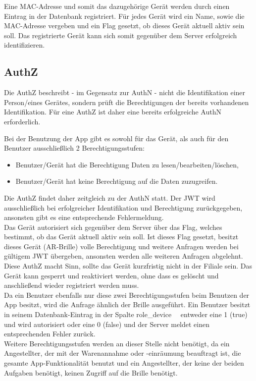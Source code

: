 Eine \ac{MAC}-Adresse und somit das dazugehörige Gerät werden durch einen Eintrag in der Datenbank registriert. Für jedes Gerät wird ein Name, sowie die \ac{MAC}-Adresse vergeben und ein Flag gesetzt, ob dieses Gerät aktuell aktiv sein soll. Das registrierte Gerät kann sich somit gegenüber dem Server erfolgreich identifizieren.

\subsection{\acf{AuthZ}}
Die \acl{AuthZ} beschreibt - im Gegensatz zur \acl{AuthN} - nicht die Identifikation einer Person/eines Gerätes, sondern prüft die Berechtigungen der bereits vorhandenen Identifikation. Für eine \acl{AuthZ} ist daher eine bereits erfolgreiche \acl{AuthN} erforderlich.

Bei der Benutzung der App gibt es sowohl für das Gerät, als auch für den Benutzer ausschließlich 2 Berechtigungsstufen:
\begin{itemize}
	\item Benutzer/Gerät hat die Berechtigung Daten zu lesen/bearbeiten/löschen,
	\item Benutzer/Gerät hat keine Berechtigung auf die Daten zuzugreifen.
\end{itemize}

Die \acl{AuthZ} findet daher zeitgleich zu der \acl{AuthN} statt. Der \ac{JWT} wird ausschließlich bei erfolgreicher Identifikation und Berechtigung zurückgegeben, ansonsten gibt es eine entsprechende Fehlermeldung.\\

Das Gerät autorisiert sich gegenüber dem Server über das Flag, welches bestimmt, ob das Gerät aktuell aktiv sein soll. Ist dieses Flag gesetzt, besitzt dieses Gerät (\zB \acs{AR}-Brille) volle Berechtigung und weitere Anfragen werden bei gültigem \ac{JWT} übergeben, ansonsten werden alle weiteren Anfragen abgelehnt. Diese \acl{AuthZ} macht Sinn, sollte das Gerät kurzfristig nicht in der Filiale sein. Das Gerät kann gesperrt und reaktiviert werden, ohne dass es gelöscht und anschließend wieder registriert werden muss.\\

Da ein Benutzer ebenfalls nur diese zwei Berechtigungsstufen beim Benutzen der App besitzt, wird die Anfrage ähnlich der Brille ausgeführt. Ein Benutzer besitzt in seinem Datenbank-Eintrag in der Spalte \glqq role\_device\grqq~~ entweder eine 1 (true) und wird autorisiert oder eine 0 (false) und der Server meldet einen entsprechenden Fehler zurück.\\

Weitere Berechtigungsstufen werden an dieser Stelle nicht benötigt, da ein Angestellter, der mit der Warenannahme oder -einräumung beauftragt ist, die gesamte App-Funktionalität benutzt und ein Angestellter, der keine der beiden Aufgaben benötigt, keinen Zugriff auf die Brille benötigt.